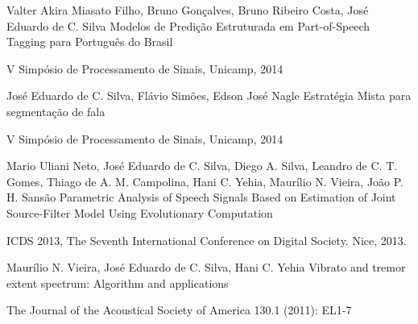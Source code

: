 

\begin{cvpublications}


  \cvpublication
    {Valter Akira Miasato Filho, Bruno Gonçalves, Bruno Ribeiro Costa, José Eduardo de C. Silva} %
    {Modelos de Predição Estruturada em Part-of-Speech Tagging para Português do Brasil} %
    {} %
    {} %
    {
      \begin{cvitems} %
        \item {V Simpósio de Processamento de Sinais, Unicamp, 2014}
      \end{cvitems}
    }

  \cvpublication
    {José Eduardo de C. Silva, Flávio Simões, Edson José Nagle} %
    {Estratégia Mista para segmentação de fala} %
    {} %
    {} %
    {
      \begin{cvitems} %
        \item {V Simpósio de Processamento de Sinais, Unicamp, 2014}
      \end{cvitems}
    }

  \cvpublication
    {Mario Uliani Neto, José Eduardo de C. Silva, Diego A. Silva, Leandro de C. T. Gomes, Thiago de A. M. Campolina, Hani C. Yehia, Maurílio N. Vieira, João P. H. Sansão} %
    {Parametric Analysis of Speech Signals Based on Estimation of Joint Source-Filter Model Using Evolutionary Computation} %
    {} %
    {} %
    {
      \begin{cvitems} %
        \item {ICDS 2013, The Seventh International Conference on Digital Society. Nice, 2013.}
      \end{cvitems}
    }

  \cvpublication
    {Maurílio N. Vieira, José Eduardo de C. Silva, Hani C. Yehia} %
    {Vibrato and tremor extent spectrum: Algorithm and applications} %
    {} %
    {} %
    {
      \begin{cvitems} %
        \item {The Journal of the Acoustical Society of America 130.1 (2011): EL1-7}
      \end{cvitems}
    }


\end{cvpublications}

